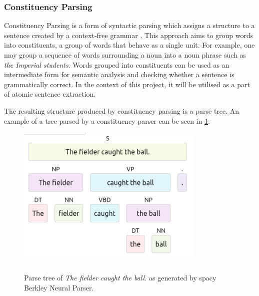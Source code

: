 \subsubsection{Constituency Parsing}

Constituency Parsing is a form of syntactic parsing which assigns a structure to a sentence created by a context-free grammar \cite{RefWorks:RefID:28-jurafsky2014speech}.
This approach aims to group words into constituents, a group of words that behave as a single unit.
For example, one may group a sequence of words surrounding a noun into a noun phrase such as \emph{the Imperial students}.
Words grouped into constituents can be used as an intermediate form for semantic analysis and checking whether a sentence is grammatically correct.
In the context of this project, it will be utilised as a part of atomic sentence extraction.


The resulting structure produced by constituency parsing is a parse tree. 
An example of a tree parsed by a constituency parser can be seen in \ref{constituency-graph}.

\begin{figure}[h]
\caption{Parse tree of \emph{The fielder caught the ball.} as generated by spacy Berkley Neural Parser.}
\centering
\includegraphics[width=0.8\textwidth]{background/constituency parse.png}
\label{constituency-graph}
\end{figure}


